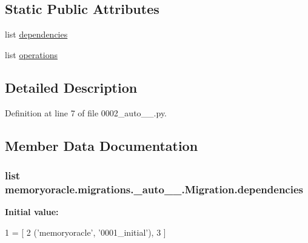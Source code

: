\subsection*{Static Public Attributes}
\begin{DoxyCompactItemize}
\item 
list \hyperlink{classmemoryoracle_1_1migrations_1_10002__auto__20150303__0042_1_1Migration_a50f20e1a9ae173c13bfa5ff281cfe607}{dependencies}
\item 
list \hyperlink{classmemoryoracle_1_1migrations_1_10002__auto__20150303__0042_1_1Migration_a8a910eb544f4f1fbc91f5b04a0d84bbd}{operations}
\end{DoxyCompactItemize}


\subsection{Detailed Description}


Definition at line 7 of file 0002\+\_\+auto\+\_\+\_.\+py.



\subsection{Member Data Documentation}
\hypertarget{classmemoryoracle_1_1migrations_1_10002__auto__20150303__0042_1_1Migration_a50f20e1a9ae173c13bfa5ff281cfe607}{}
\subsubsection[{dependencies}]{\setlength{\rightskip}{0pt plus 5cm}list memoryoracle.\+migrations.\+\_\+auto\+\_\+\_.\+Migration.\+dependencies\hspace{0.3cm}{\ttfamily [static]}}\label{classmemoryoracle_1_1migrations_1_10002__auto__20150303__0042_1_1Migration_a50f20e1a9ae173c13bfa5ff281cfe607}
{\bfseries Initial value\+:}
\begin{DoxyCode}
1 = [
2         (\textcolor{stringliteral}{'memoryoracle'}, \textcolor{stringliteral}{'0001\_initial'}),
3     ]
\end{DoxyCode}


